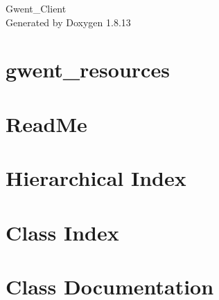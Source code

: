 \documentclass[twoside]{book}
\newcommand{\+}{\discretionary{\mbox{\scriptsize$\hookleftarrow$}}{}{}}
\newcommand{\clearemptydoublepage}{%
  \newpage{\pagestyle{empty}\cleardoublepage}%
}
\begin{document}
\hypersetup{pageanchor=false,
             bookmarksnumbered=true,
             pdfencoding=unicode
            }
\begin{titlepage}
\vspace*{7cm}
\begin{center}%
{\Large Gwent\+\_\+\+Client }\\
\vspace*{1cm}
{\large Generated by Doxygen 1.8.13}\\
\end{center}
\end{titlepage}
\clearemptydoublepage
{}
\tableofcontents
\clearemptydoublepage
{}
\hypersetup{pageanchor=true}

\chapter{gwent\+\_\+resources}
\label{md_gwent_resources-master_gwent_resources-master__r_e_a_d_m_e}

\chapter{Read\+Me}
\label{md_gwent_resources-master_gwent_resources-master__xE6_x9C_xAF_xE8_xAF_xAD_xE8_xA7_xA3_xE9_x87_x8A__read_me}

\chapter{Hierarchical Index}

\chapter{Class Index}

\chapter{Class Documentation}




























\backmatter
\newpage
{}
\clearemptydoublepage
{}
\printindex
\end{document}
